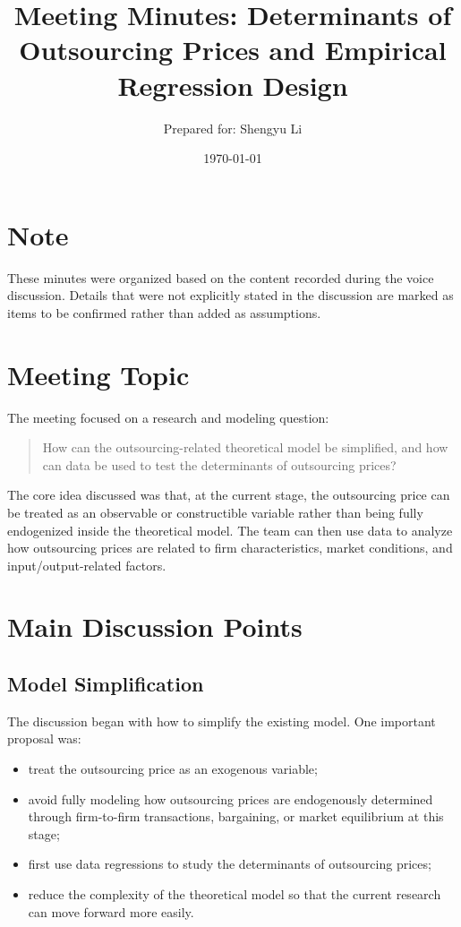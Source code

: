 \documentclass[11pt,a4paper]{article}
\title{\textbf{Meeting Minutes: Determinants of Outsourcing Prices and Empirical Regression Design}}
\author{Prepared for: Shengyu Li}
\date{\today}
\begin{document}
\maketitle

\tableofcontents
\newpage

\section*{Note}
These minutes were organized based on the content recorded during the voice discussion. Details that were not explicitly stated in the discussion are marked as items to be confirmed rather than added as assumptions.

\section{Meeting Topic}

The meeting focused on a research and modeling question:

\begin{quote}
How can the outsourcing-related theoretical model be simplified, and how can data be used to test the determinants of outsourcing prices?
\end{quote}

The core idea discussed was that, at the current stage, the outsourcing price can be treated as an observable or constructible variable rather than being fully endogenized inside the theoretical model. The team can then use data to analyze how outsourcing prices are related to firm characteristics, market conditions, and input/output-related factors.

\section{Main Discussion Points}

\subsection{Model Simplification}

The discussion began with how to simplify the existing model. One important proposal was:

\begin{itemize}
    \item treat the outsourcing price as an exogenous variable;
    \item avoid fully modeling how outsourcing prices are endogenously determined through firm-to-firm transactions, bargaining, or market equilibrium at this stage;
    \item first use data regressions to study the determinants of outsourcing prices;
    \item reduce the complexity of the theoretical model so that the current research can move forward more easily.
\end{itemize}
\end{document}

